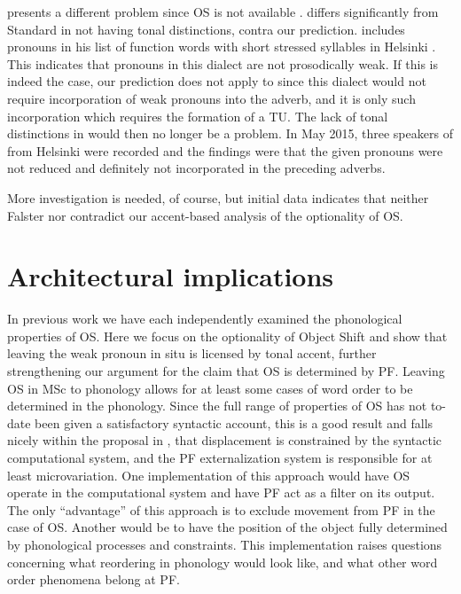 \documentclass[output=paper]{LSP/langsci}
\begin{document}
 presents a different problem since OS is not available \citep[72]{Bergroth1917}.  differs significantly from Standard  in not having tonal distinctions, contra our prediction. \citet[17]{Kiparsky2008} includes pronouns in his list of function words with short stressed syllables in Helsinki . This indicates that pronouns in this dialect are not prosodically weak. If this is indeed the case, our prediction does not apply to  since this dialect would not require incorporation of weak pronouns into the adverb, and it is only such incorporation which requires the formation of a TU. The lack of tonal distinctions in  would then no longer be a problem. In May 2015, three speakers of  from Helsinki were recorded and the findings were that the given pronouns were not reduced and definitely not incorporated in the preceding adverbs. 

More investigation is needed, of course, but initial data indicates that neither Falster  nor  contradict our accent-based analysis of the optionality of OS. 

\section{Architectural implications}\label{sec:erteschik:6}

In previous work we have each independently examined the phonological properties of OS. Here we focus on the optionality of Object Shift and show that leaving the weak pronoun in situ is licensed by tonal accent, further strengthening our argument for the claim that OS is determined by PF. Leaving OS in MSc to phonology allows for at least some cases of word order to be determined in the phonology. Since the full range of properties of OS has not to-date been given a satisfactory syntactic account, this is a good result and falls nicely within the proposal in \citet{Berwick2011}, that displacement is constrained by the syntactic computational system, and the PF externalization system is responsible for at least microvariation. One implementation of this approach would have OS operate in the computational system and have PF act as a filter on its output. The only “advantage” of this approach is to exclude movement from PF in the case of OS. Another would be to have the position of the object fully determined by phonological processes and constraints. This implementation raises questions concerning what reordering in phonology would look like, and what other word order phenomena belong at PF.
\end{document}
